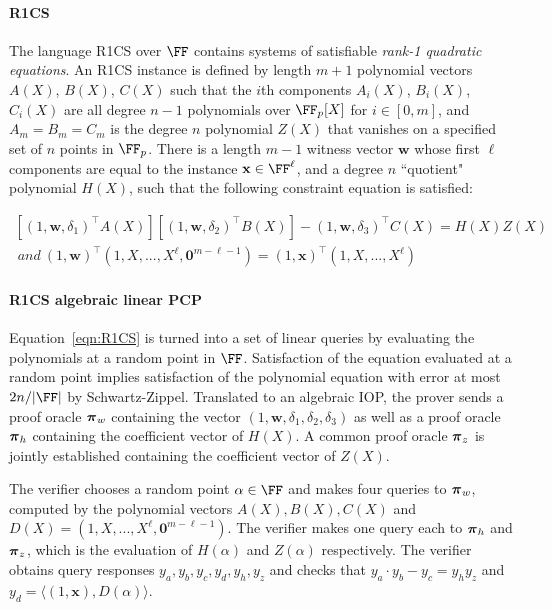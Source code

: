 \paragraph{R1CS}  The language R1CS over $\FF$ contains systems of satisfiable \emph{rank-1 quadratic equations}. An R1CS instance is defined by length $m+1$ polynomial vectors $A(X)$, $B(X)$, $C(X)$ such that the $i$th components $A_i(X)$, $B_i(X)$, $C_i(X)$ are all degree $n-1$ polynomials over $\FF_p[X]$ for $i \in [0,m]$, and $A_m = B_m = C_m$ is the degree $n$ polynomial $Z(X)$ that vanishes on a specified set of $n$ points in $\FF_p$. There is a length $m-1$ witness vector $\mathbf{w}$ whose first $\ell$ components are equal to the instance $\mathbf{x} \in \FF^\ell$, and a degree $n$ ``quotient" polynomial $H(X)$, such that the following constraint equation is satisfied: 

\begin{equation} \label{eqn:R1CS} 
\begin{split}
[(1, \mathbf{w}, \delta_1)^\top A(X)][(1, \mathbf{w}, \delta_2)^\top B(X)] 
- (1, \mathbf{w}, \delta_3)^\top C(X) = H(X)Z(X) \\ 
\ and \ (1,\mathbf{w})^\top (1,X,...,X^{\ell}, \mathbf{0}^{m- \ell -1}) = (1,\mathbf{x})^\top (1, X,...,X^{\ell})
\end{split} 
\end{equation}

\paragraph{R1CS algebraic linear PCP} Equation~\ref{eqn:R1CS} is turned into a set of linear queries by evaluating the polynomials at a random point in $\FF$. Satisfaction of the equation evaluated at a random point implies satisfaction of the polynomial equation with error at most $2n / |\FF|$ by Schwartz-Zippel. Translated to an algebraic IOP, the prover sends a proof oracle $\boldsymbol{\pi}_w$ containing the vector $(1, \mathbf{w}, \delta_1, \delta_2, \delta_3)$ as well as a proof oracle $\boldsymbol{\pi}_h$ containing the coefficient vector of $H(X)$. A common proof oracle $\boldsymbol{\pi}_z$ is jointly established containing the coefficient vector of $Z(X)$. 

The verifier chooses a random point $\alpha \in \FF$ and makes four queries to $\boldsymbol{\pi}_w$, computed by the polynomial vectors $A(X), B(X), C(X)$ and $D(X) = (1, X,...,X^\ell, \mathbf{0}^{m- \ell -1})$. The verifier makes one query each to $\boldsymbol{\pi}_h$ and $\boldsymbol{\pi}_z$, which is the evaluation of $H(\alpha)$ and $Z(\alpha)$ respectively. The verifier obtains query responses $y_a, y_b, y_c, y_d, y_h, y_z$ and checks that $y_a \cdot y_b - y_c = y_h y_z$ and $y_d = \langle (1, \mathbf{x}), D(\alpha) \rangle$. 

